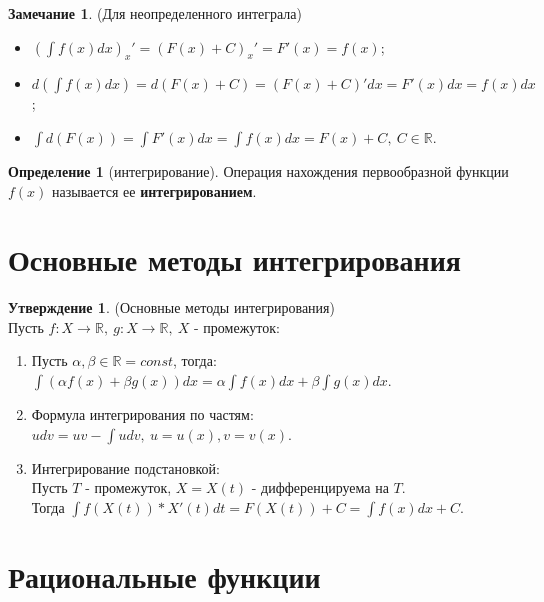 \documentclass{report}
\theoremstyle{definition}
\newtheorem*{definition}{Определение}
\newtheorem*{statement}{Утверждение}
\newtheorem*{remark}{Замечание}
\begin{document}
\begin{remark}
    (Для неопределенного интеграла)
    \begin{itemize}
        \item \((\int f(x) dx)_{x}' = (F(x) + C)_{x}' = F'(x) = f(x)\);
        \item \(d(\int f(x) dx) = d(F(x) + C) = (F(x) + C)' dx = F'(x) dx = f(x) dx\);
        \item \(\int d(F(x)) = \int F'(x) dx = \int f(x) dx = F(x) + C, \ C \in \mathbb{R}\).
    \end{itemize}
\end{remark}

\begin{definition}[интегрирование]
    Операция нахождения первообразной функции \(f(x)\) называется ее \textbf{интегрированием}.
\end{definition}

\section{Основные методы интегрирования}

\begin{statement}
    (Основные методы интегрирования) \\
    Пусть \(f: X \rightarrow \mathbb{R}, \ g:X \rightarrow \mathbb{R}, \ X\) - промежуток:
    \begin{enumerate}
        \item Пусть \(\alpha, \beta \in \mathbb{R} = const\), тогда:\\
              \(\int (\alpha f(x) + \beta g(x)) dx = \alpha \int f(x) dx + \beta \int g(x) dx\).
        \item Формула интегрирования по частям: \\
              \(udv = uv - \int udv, \ u = u(x), v = v(x)\).
        \item Интегрирование подстановкой: \\
              Пусть \(T\) - промежуток, \(X = X(t)\) - дифференцируема на \(T\). \\
              Тогда \(\int f(X(t)) * X'(t) dt = F(X(t)) + C = \int f(x) dx + C\).
    \end{enumerate}
\end{statement}

\section{Рациональные функции}
\end{document}
